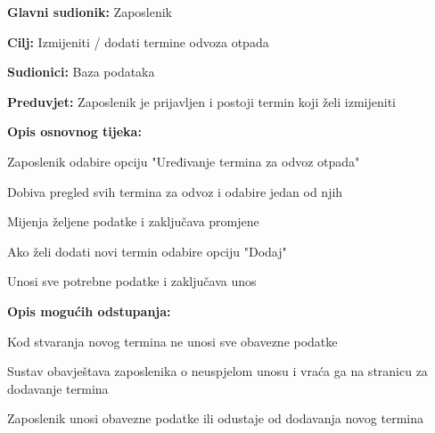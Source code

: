 				\noindent {}
				\begin{packed_item}
					
					\item \textbf{Glavni sudionik: }Zaposlenik
					\item  \textbf{Cilj:} Izmijeniti / dodati termine odvoza otpada
					\item  \textbf{Sudionici:} Baza podataka
					\item  \textbf{Preduvjet:} Zaposlenik je prijavljen i postoji termin koji želi izmijeniti
					\item  \textbf{Opis osnovnog tijeka:}
					
					\item[] \begin{packed_enum}
						
						\item Zaposlenik odabire opciju "Uređivanje termina za odvoz otpada"
						\item Dobiva pregled svih termina za odvoz i odabire jedan od njih
						\item Mijenja željene podatke i zaključava promjene
						\item Ako želi dodati novi termin odabire opciju "Dodaj"
						\item Unosi sve potrebne podatke i zaključava unos
					\end{packed_enum}
					
					\item  \textbf{Opis mogućih odstupanja:}
					
					\item[] \begin{packed_item}
						
						\item[2.a] Kod stvaranja novog termina ne unosi sve obavezne podatke
						\item[] \begin{packed_enum}
							
							\item Sustav obavještava zaposlenika o neuspjelom unosu i vraća ga na stranicu za dodavanje termina
							\item Zaposlenik unosi obavezne podatke ili odustaje od dodavanja novog termina
							
						\end{packed_enum}
						
						
					\end{packed_item}
				\end{packed_item}
			
